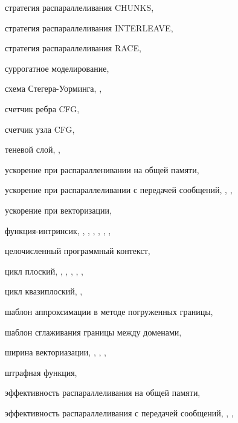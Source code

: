 стратегия распараллеливания CHUNKS, \pageref{term:parallel_strategy_chunks}

стратегия распараллеливания INTERLEAVE, \pageref{term:parallel_strategy_interleave}

стратегия распараллеливания RACE, \pageref{term:parallel_strategy_race}

суррогатное моделирование, \pageref{term:surrogate_modeling}

схема Стегера-Уорминга, \pageref{term:steger_warming_scheme}, \pageref{term:steger_warming_scheme2}

счетчик ребра CFG, \pageref{term:counter_edge}

счетчик узла CFG, \pageref{term:counter_node}

теневой слой, \pageref{term:block_shadow_layer}, \pageref{term:block_shadow_layer2}

ускорение при распаралленивании на общей памяти, \pageref{term:shr_speedup}

ускорение при распараллеливании с передачей сообщений, \pageref{term:msg_speedup}, \pageref{term:msg_speedup2}, \pageref{term:msg_speedup3}

ускорение при векторизации, \pageref{term:vec_speedup}

функция-интринсик, \pageref{term:intrinsic}, \pageref{term:intrinsic2}, \pageref{term:intrinsic3}, \pageref{term:intrinsic4}, \pageref{term:intrinsic5}, \pageref{term:intrinsic6}, \pageref{term:intrinsic7}

целочисленный программный контекст, \pageref{term:integer_context}

цикл плоский, \pageref{term:flat_loop}, \pageref{term:flat_loop2}, \pageref{term:flat_loop3}, \pageref{term:flat_loop4}, \pageref{term:flat_loop5}, \pageref{term:flat_loop6}

цикл квазиплоский, \pageref{term:flat_kvazy_flat}, \pageref{term:flat_kvazy_flat2}

шаблон аппроксимации в методе погруженных границы, \pageref{term:ibm_template}

шаблон сглаживания границы между доменами, \pageref{term:smooth_template}

ширина векториазации, \pageref{term:vec_shir}, \pageref{term:vec_shir2}, \pageref{term:vec_shir3}, \pageref{term:vec_shir4}

штрафная функция, \pageref{term:penalty_function}

эффективность распараллеливания на общей памяти, \pageref{term:shr_eff}

эффективность распараллеливания с передачей сообщений, \pageref{term:msg_eff}, \pageref{term:msg_eff2}, \pageref{term:msg_eff3}

